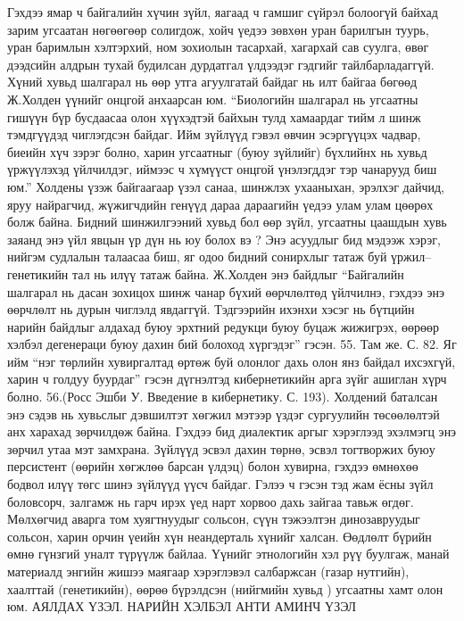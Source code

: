 Гэхдээ ямар ч байгалийн хүчин зүйл, яагаад ч гамшиг сүйрэл болоогүй байхад зарим угсаатан нөгөөгөөр солигдож, хойч үедээ зөвхөн уран барилгын туурь, уран баримлын хэлтэрхий, ном зохиолын тасархай, хагархай сав суулга, өвөг дээдсийн алдрын тухай будилсан дурдатгал үлдээдэг гэдгийг тайлбарладаггүй. Хүний хувьд шалгарал нь өөр утга агуулгатай байдаг нь илт байгаа бөгөөд Ж.Холден үүнийг онцгой анхаарсан юм. “Биологийн шалгарал нь угсаатны гишүүн бүр бусдаасаа олон хүүхэдтэй байхын тулд хамаардаг тийм л шинж тэмдгүүдэд чиглэгдсэн байдаг. Ийм зүйлүүд гэвэл өвчин эсэргүүцэх чадвар, биеийн хүч зэрэг болно, харин угсаатныг (буюу зүйлийг) бүхлийнх нь хувьд үржүүлэхэд үйлчилдэг, иймээс ч хүмүүст онцгой үнэлэгддэг тэр чанарууд биш юм.” Холдены үзэж байгаагаар үзэл санаа, шинжлэх ухааныхан, эрэлхэг дайчид, яруу найрагчид, жүжигчдийн генүүд дараа дараагийн үедээ улам улам цөөрөх болж байна. Бидний шинжилгээний хувьд бол өөр зүйл, угсаатны цаашдын хувь заяанд энэ үйл явцын үр дүн нь юу болох вэ ? Энэ асуудлыг бид мэдээж хэрэг, нийгэм судлалын талаасаа биш, яг одоо бидний сонирхлыг татаж буй үржил–генетикийн тал нь илүү татаж байна. Ж.Холден энэ байдлыг “Байгалийн шалгарал нь дасан зохицох шинж чанар бүхий өөрчлөлтөд үйлчилнэ, гэхдээ энэ өөрчлөлт нь дурын чиглэлд явдаггүй. Тэдгээрийн ихэнхи хэсэг нь бүтцийн нарийн байдлыг алдахад буюу эрхтний редукци буюу буцаж жижигрэх, өөрөөр хэлбэл дегенераци буюу дахин бий болоход хүргэдэг” гэсэн. 55. Там же. С. 82. Яг ийм “нэг төрлийн хувиргалтад өртөж буй олонлог дахь олон янз байдал ихсэхгүй, харин ч голдуу буурдаг” гэсэн дүгнэлтэд кибернетикийн арга зүйг ашиглан хүрч болно. 56.(Росс Эшби У. Введение в кибернетику. С. 193).
Холдений баталсан энэ сэдэв нь хувьслыг дэвшилтэт хөгжил мэтээр үздэг сургуулийн төсөөлөлтэй анх харахад зөрчилдөж байна. Гэхдээ бид диалектик аргыг хэрэглээд эхэлмэгц энэ зөрчил утаа мэт замхрана. Зүйлүүд эсвэл дахин төрнө, эсвэл тогтворжих буюу персистент (өөрийн хөгжлөө барсан үлдэц) болон хувирна, гэхдээ өмнөхөө бодвол илүү төгс шинэ зүйлүүд үүсч байдаг. Гэлээ ч гэсэн тэд жам ёсны зүйл боловсорч, залгамж нь гарч ирэх үед нарт хорвоо дахь зайгаа тавьж өгдөг. Мөлхөгчид аварга том хуягтнуудыг сольсон, сүүн тэжээлтэн динозавруудыг сольсон, харин орчин үеийн хүн неандерталь хүнийг халсан. Өөдлөлт бүрийн өмнө гүнзгий уналт түрүүлж байлаа.
Үүнийг этнологийн хэл рүү буулгаж, манай материалд энгийн жишээ маягаар хэрэглэвэл салбаржсан (газар нутгийн), хаалттай (генетикийн), өөрөө бүрэлдсэн (нийгмийн хувьд ) угсаатны хамт олон юм.
АЯЛДАХ ҮЗЭЛ. НАРИЙН ХЭЛБЭЛ АНТИ АМИНЧ ҮЗЭЛ
